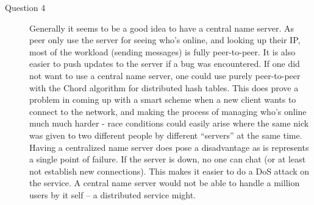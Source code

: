 \begin{description}
    \item[Question 4]
        Generally it seems to be a good idea to have a central name server. As peer only use the server for seeing who's online, and looking up their IP, most of the workload (sending messages) is fully peer-to-peer. It is also easier to push updates to the server if a bug was encountered. If one did not want to use a central name server, one could use purely peer-to-peer with the Chord algorithm for distributed hash tables. This does prove a problem in coming up with a smart scheme when a new client wants to connect to the network, and making the process of managing who's online much much harder - race conditions could easily arise where the same nick was given to two different people by different ``servers'' at the same time. Having a centralized name server does pose a disadvantage as is represents a single point of failure. If the server is down, no one can chat (or at least not establish new connections). This makes it easier to do a DoS attack on the service. A central name server would not be able to handle a million users by it self -- a distributed service might.
\end{description}
